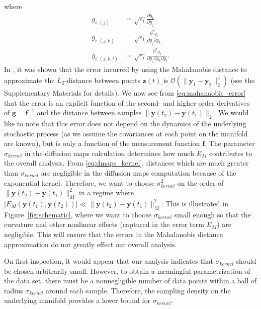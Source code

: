 %
where
%
\begin{equation}
\begin{aligned}
g_{i,(j)} &= \sqrt{e_i} \frac{\partial g_i}{\partial y_j}
\\
g_{i,(j,k)} &= \sqrt{e_i}  \frac{\partial^2 g_i}{\partial y_j \partial y_k}
\\
g_{i,(j,k,l)} &= \sqrt{e_i}  \frac{\partial^3 g_i}{\partial y_j \partial y_k \partial y_l} .
\end{aligned}
\end{equation}
%
In \cite{singer2008non}, it was shown that the error incurred by using the Mahalanobis distance to approximate the $L_2$-distance between points $\mathbf{z}(t)$ is $\mathcal{O} (\|\mathbf{y}_1 - \mathbf{y}_2 \|_2^4 )$ (see the Supplementary Materials for details).
%
We now see from \eqref{eq:mahanaobis_error} that the error is an explicit function of the second- and higher-order derivatives of $\mathbf{g} = \mathbf{f}^{-1}$ and the distance between samples $\| \mathbf{y}(t_2) - \mathbf{y}(t_1) \|_2$.
%
We would like to note that this error does not depend on the dynamics of the underlying stochastic process (as we assume the covariances at each point on the manifold are known), but is only a function of the measurement function $\mathbf{f}$.
%
The parameter $\sigma_{kernel}$ in the diffusion maps calculation determines how much $E_M$ contributes to the overall analysis.
%
From \eqref{eq:dmaps_kernel}, distances which are much greater than $\sigma_{kernel}$ are negligible in the diffusion maps computation because of the exponential kernel.
%
Therefore, we want to choose $\sigma_{kernel}^2$ on the order of $\|\mathbf{y}(t_2) - \mathbf{y}(t_1)\|^2_M$ in a regime where $| E_M(\mathbf{y}(t_1), \mathbf{y}(t_2))|  \ll \|\mathbf{y}(t_2) - \mathbf{y}(t_1)\|^2_M$.
%
This is illustrated in Figure~\ref{fig:schematic}, where we want to choose $\sigma_{kernel}$ small enough so that the curvature and other nonlinear effects (captured in the error term $E_M$) are negligible.
%
This will ensure that the errors in the Mahalanobis distance approximation do not greatly effect our overall analysis.

On first inspection, it would appear that our analysis indicates that $\sigma_{kernel}$ should be chosen arbitrarily small.
%
However, to obtain a meaningful parametrization of the data set, there must be a nonnegligible number of data points within a ball of radius $\sigma_{kernel}$ around each sample.
%
Therefore, the sampling density on the underlying manifold provides a lower bound for $\sigma_{kernel}$.

